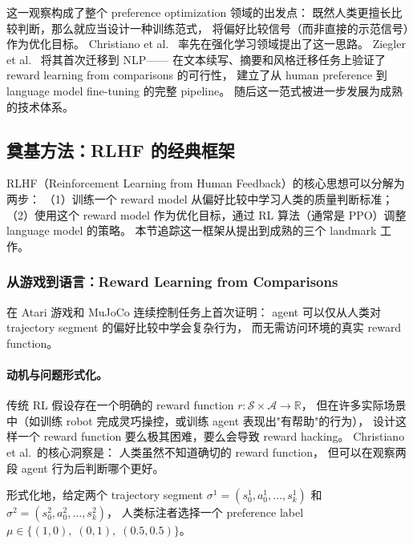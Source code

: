 
\noindent
这一观察构成了整个 preference optimization 领域的出发点：
既然人类更擅长比较判断，那么就应当设计一种训练范式，
将偏好比较信号（而非直接的示范信号）作为优化目标。
Christiano et al.\ \cite{christiano2017rlhf} 率先在强化学习领域提出了这一思路。
Ziegler et al.\ \cite{ziegler2020finetuning} 将其首次迁移到 NLP——
在文本续写、摘要和风格迁移任务上验证了 reward learning from comparisons 的可行性，
建立了从 human preference 到 language model fine-tuning 的完整 pipeline。
随后这一范式被进一步发展为成熟的技术体系。

\subsection{奠基方法：RLHF 的经典框架}
\label{sec:t2-foundation}

RLHF（Reinforcement Learning from Human Feedback）的核心思想可以分解为两步：
（1）训练一个 reward model 从偏好比较中学习人类的质量判断标准；
（2）使用这个 reward model 作为优化目标，通过 RL 算法（通常是 PPO）调整 language model 的策略。
本节追踪这一框架从提出到成熟的三个 landmark 工作。

\subsubsection{从游戏到语言：Reward Learning from Comparisons}
\label{sec:t2-christiano}

 在 Atari 游戏和 MuJoCo 连续控制任务上首次证明：
agent 可以仅从人类对 trajectory segment 的偏好比较中学会复杂行为，
而无需访问环境的真实 reward function。

\paragraph{动机与问题形式化。}
传统 RL 假设存在一个明确的 reward function $r: \mathcal{S} \times \mathcal{A} \to \mathbb{R}$，
但在许多实际场景中（如训练 robot 完成灵巧操控，或训练 agent 表现出"有帮助"的行为），
设计这样一个 reward function 要么极其困难，要么会导致 reward hacking。
Christiano et al.\ 的核心洞察是：
人类虽然不知道确切的 reward function，
但可以在观察两段 agent 行为后判断哪个更好。

形式化地，给定两个 trajectory segment $\sigma^1 = (s_0^1, a_0^1, \ldots, s_k^1)$ 和
$\sigma^2 = (s_0^2, a_0^2, \ldots, s_k^2)$，
人类标注者选择一个 preference label $\mu \in \{(1,0),\; (0,1),\; (0.5, 0.5)\}$。

